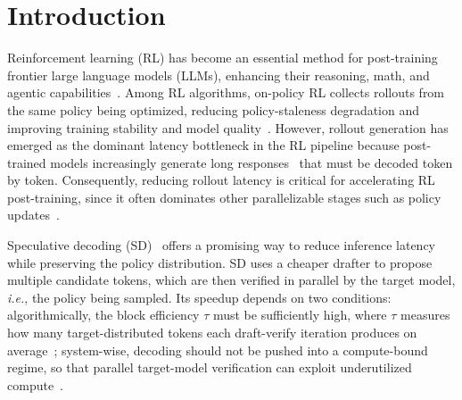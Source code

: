 \documentclass{llmxive}
\providecommand{\mal}{\tau}
\providecommand{\bottleneck}{latency bottleneck}
\begin{document}
\section{Introduction}
\label{sec:introduction}

Reinforcement learning (RL) has become an essential method for post-training frontier large language models (LLMs), enhancing their reasoning, math, and agentic capabilities~\citep{guo2025deepseek, yang2025qwen3, team2025kimi, zeng2025glm}.
Among RL algorithms, on-policy RL collects rollouts from the same policy being optimized, reducing policy-staleness degradation and improving training stability and model quality~\citep{kumar2025llm,fu2025areal}.
However, rollout generation has emerged as the dominant \bottleneck{} in the RL pipeline because post-trained models increasingly generate long responses~\citep{chen2024not,guo2025deepseek,yu2025dapo,liu2025understanding} that must be decoded token by token.
Consequently, reducing rollout latency is critical for accelerating RL post-training, since it often dominates other parallelizable stages such as policy updates~\citep{schulman2017proximal}.

Speculative decoding (SD)~\citep{leviathan2023fast,chen2023accelerating} offers a promising way to reduce inference latency while preserving the policy distribution.
SD uses a cheaper drafter to propose multiple candidate tokens, which are then verified in parallel by the target model, \textit{i.e.}, the policy being sampled.
Its speedup depends on two conditions: algorithmically, the block efficiency $\mal$ must be sufficiently high, where $\mal$ measures how many target-distributed tokens each draft-verify iteration produces on average~\citep{zhou2024distillspec,liu2025speculative};
system-wise, decoding should not be pushed into a compute-bound regime, so that parallel target-model verification can exploit underutilized compute~\citep{leviathan2023fast,sadhukhan2024magicdec,liu2025speculative}.
\end{document}
